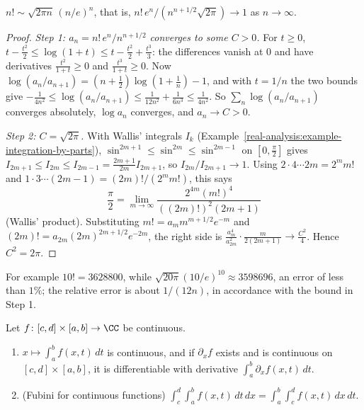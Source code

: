 \begin{theorem}\label{real-analysis:theorem-stirling}
$n! \sim \sqrt{2\pi n}\,(n/e)^n$, that is, $n!\,e^n/(n^{n + 1/2}\sqrt{2\pi}) \to 1$ as $n \to \infty$.
\end{theorem}

\begin{proof}
\emph{Step 1: $a_n = n!\,e^n/n^{n + 1/2}$ converges to some $C > 0$.} For $t \geq 0$, $t - \frac{t^2}2 \leq \log(1 + t) \leq t - \frac{t^2}2 + \frac{t^3}3$: the differences vanish at $0$ and have
derivatives $\frac{t^2}{1 + t} \geq 0$ and $\frac{t^3}{1 + t} \geq 0$. Now $\log(a_n/a_{n+1}) = (n + \frac12)\log(1 + \frac1n) - 1$, and with $t = 1/n$ the two bounds give
$-\frac{1}{4n^2} \leq \log(a_n/a_{n+1}) \leq \frac{1}{12n^2} + \frac{1}{6n^3} \leq \frac{1}{4n^2}$. So $\sum_n\log(a_n/a_{n+1})$ converges absolutely, $\log a_n$ converges, and $a_n \to C > 0$.

\emph{Step 2: $C = \sqrt{2\pi}$.} With Wallis' integrals $I_k$ (Example~\ref{real-analysis:example-integration-by-parts}), $\sin^{2m+1} \leq \sin^{2m} \leq \sin^{2m-1}$ on $[0, \frac\pi2]$ gives
$I_{2m+1} \leq I_{2m} \leq I_{2m-1} = \frac{2m+1}{2m}I_{2m+1}$, so $I_{2m}/I_{2m+1} \to 1$. Using $2 \cdot 4 \cdots 2m = 2^mm!$ and $1 \cdot 3 \cdots (2m - 1) = (2m)!/(2^mm!)$, this says
\[
\frac\pi2 = \lim_{m \to \infty}\frac{2^{4m}(m!)^4}{((2m)!)^2(2m + 1)}
\]
(Wallis' product). Substituting $m! = a_mm^{m + 1/2}e^{-m}$ and $(2m)! = a_{2m}(2m)^{2m + 1/2}e^{-2m}$, the right side is $\frac{a_m^4}{a_{2m}^2}\cdot\frac{m}{2(2m + 1)} \to \frac{C^2}{4}$. Hence
$C^2 = 2\pi$.
\end{proof}

For example $10! = 3628800$, while $\sqrt{20\pi}(10/e)^{10} \approx 3598696$, an error of less than $1\%$; the relative error is about $1/(12n)$, in accordance with the bound in Step 1.

\begin{proposition}\label{real-analysis:proposition-parameter-integrals}
Let $f \colon [c, d] \times [a, b] \to \CC$ be continuous.
\begin{enumerate}
\item $x \mapsto \int_a^bf(x, t)\,dt$ is continuous, and if $\partial_xf$ exists and is continuous on $[c, d] \times [a, b]$, it is differentiable with derivative $\int_a^b\partial_xf(x, t)\,dt$.
\item (Fubini for continuous functions) $\int_c^d\int_a^bf(x, t)\,dt\,dx = \int_a^b\int_c^df(x, t)\,dx\,dt$.
\end{enumerate}
\end{proposition}

